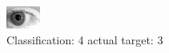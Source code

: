\begin{figure}[h!]
\begin{center}
\includegraphics[width=0.60\columnwidth]{figures/ID215_class_4_target_3.png}
\end{center}
\caption{ Classification: 4 actual target: 3}
\label{fig:ID215_class_4_target_3}
\end{figure}
